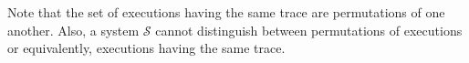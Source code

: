 
Note that the set of executions having the same trace are permutations of one another. Also, a system $\mathcal{S}$ cannot distinguish between permutations of executions or equivalently, executions having the same trace.




%

